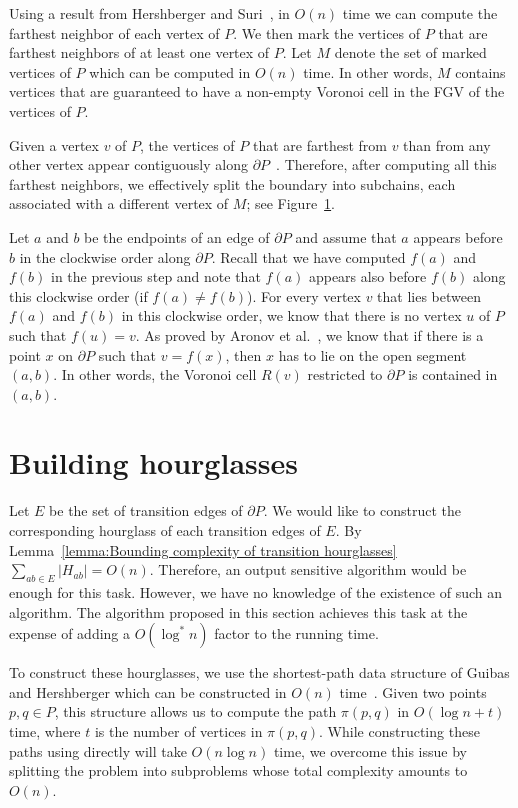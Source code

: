 \documentclass[a4paper,UKenglish]{lipics}
\newcommand{\ff}[1]{\ensuremath{f(#1)}}
\newcommand{\p}[2]{\ensuremath{\pi(#1, #2)}}
\begin{document}
Using a result from Hershberger and Suri~\cite{hershberger1993matrix}, in $O(n)$ time we can compute the farthest neighbor of each vertex of $P$.
We then mark the vertices of $P$ that are farthest neighbors of at least one vertex of $P$.
Let $M$ denote the set of marked vertices of $P$ which can be computed in $O(n)$ time.
In other words, $M$ contains vertices that are guaranteed to have a non-empty Voronoi cell in the FGV of the vertices of $P$.

Given a vertex $v$ of $P$, the vertices of $P$ that are farthest from $v$ than from any other vertex appear contiguously along $\partial P$~\cite{aronov1993furthest}. Therefore, after computing all this farthest neighbors, we effectively split the boundary into subchains, each associated with a different vertex of $M$; see Figure~\ref{}.

Let $a$ and $b$ be the endpoints of an edge of $\partial P$ and assume that $a$ appears before $b$ in the clockwise order along $\partial P$. Recall that we have computed $\ff{a}$ and $\ff{b}$ in the previous step and note that $\ff{a}$ appears also before $\ff{b}$ along this clockwise order (if $\ff{a} \neq \ff{b}$). 
For every vertex $v$ that lies between $\ff{a}$ and $\ff{b}$ in this clockwise order, we know that there is no vertex $u$ of $P$ such that $\ff{u} = v$.
As proved by Aronov et al.~\cite[Corollary 2.7.4]{aronov1993furthest}, we know that if there is a point $x$ on $\partial P$ such that $v = \ff{x}$, then $x$ has to lie on the open segment $(a,b)$. 
In other words, the Voronoi cell $R(v)$ restricted to $\partial P$ is contained in~$(a,b)$.

\section{Building hourglasses}

Let $E$ be the set of transition edges of $\partial P$.
We would like to construct the corresponding hourglass of each transition edges of $E$.
By Lemma~\ref{lemma:Bounding complexity of transition hourglasses} $\sum_{ab\in E} |H_{ab}| = O(n)$.
Therefore, an output sensitive algorithm would be enough for this task. 
However, we have no knowledge of the existence of such an algorithm. 
The algorithm proposed in this section achieves this task at the expense of adding a $O(\log^*n)$ factor to the running time.

To construct these hourglasses, we use the shortest-path data structure of Guibas and Hershberger which can be constructed in $O(n)$ time~\cite{guibasShortestPathQueries}. 
Given two points $p,q\in P$, this structure allows us to compute the path $\p{p}{q}$ in $O(\log n + t)$ time, where $t$ is the number of vertices in $\p{p}{q}$. 
While constructing these paths using directly will take $O(n \log n)$ time, we overcome this issue by splitting the problem into subproblems whose total complexity amounts to $O(n)$.
 
\end{document}
